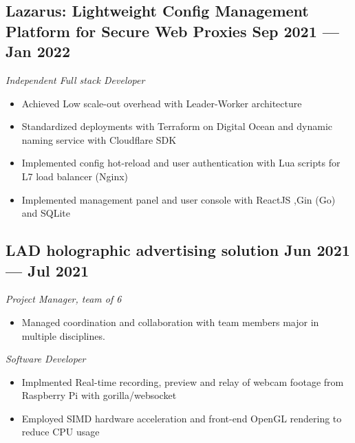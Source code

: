 \documentclass[a4,12pt]{article}
\newcommand{\subtext}[1]{
#1\par\vspace{-0.3cm}}
\newenvironment{zitemize}{
\begin{itemize}\itemsep0pt \parskip0pt \parsep1pt}
{\end{itemize}\vspace{-0.5cm}}
\begin{document}
\subsection*{Lazarus: {\normalsize\normalfont Lightweight Config Management Platform for Secure Web Proxies} \hfill \textbf{Sep 2021 --- Jan 2022}}
\subtext{\textit{Independent Full stack Developer}}
\begin{zitemize}
    \item Achieved Low scale-out overhead with Leader-Worker architecture
    \item Standardized deployments with Terraform on Digital Ocean and dynamic naming service with Cloudflare SDK
    \item Implemented config hot-reload and user authentication with Lua scripts for L7 load balancer (Nginx)
    \item Implemented management panel and user console with ReactJS ,Gin (Go) and SQLite
\end{zitemize}


\subsection*{LAD holographic advertising solution \hfill \textbf{Jun 2021 --- Jul 2021}}
\subtext{\textit{Project Manager, team of 6}}
\begin{zitemize}
    \item Managed coordination and collaboration with team members major in multiple disciplines.
\end{zitemize}

\vspace{0.3cm}
\subtext{\textit{Software Developer}}
\begin{zitemize}
    \item Implmented Real-time recording, preview and relay of webcam footage from Raspberry Pi with gorilla/websocket
    \item Employed SIMD hardware acceleration and front-end OpenGL rendering to reduce CPU usage
\end{zitemize}

\end{document}

